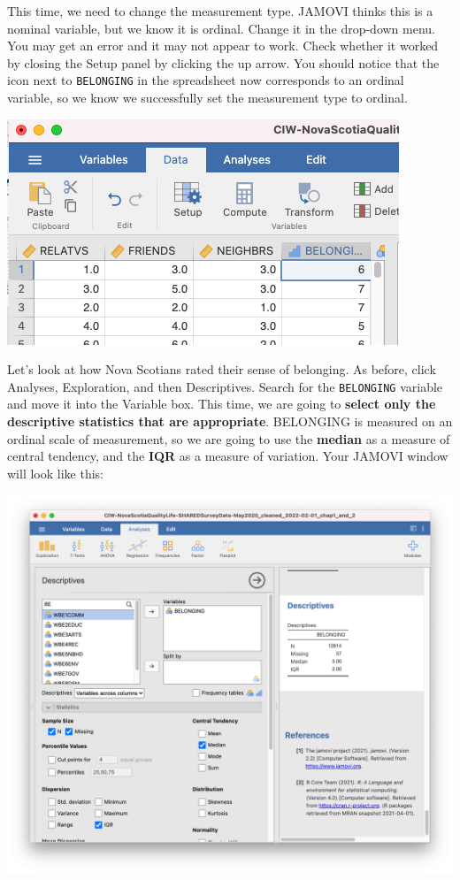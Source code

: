 \documentclass[
]{book}
\begin{document}
This time, we need to change the measurement type. JAMOVI thinks this is a nominal variable, but we know it is ordinal. Change it in the drop-down menu. You may get an error and it may not appear to work. Check whether it worked by closing the Setup panel by clicking the up arrow. You should notice that the icon next to \texttt{BELONGING} in the spreadsheet now corresponds to an ordinal variable, so we know we successfully set the measurement type to ordinal.

\includegraphics{img/belongingordinal.png}

Let's look at how Nova Scotians rated their sense of belonging. As before, click {Analyses}, {Exploration}, and then {Descriptives}. Search for the \texttt{BELONGING} variable and move it into the Variable box. This time, we are going to \textbf{select only the descriptive statistics that are appropriate}. BELONGING is measured on an ordinal scale of measurement, so we are going to use the \textbf{median} as a measure of central tendency, and the \textbf{IQR} as a measure of variation. Your JAMOVI window will look like this:

\includegraphics{img/belongingordinaloutput.png}
\end{document}
